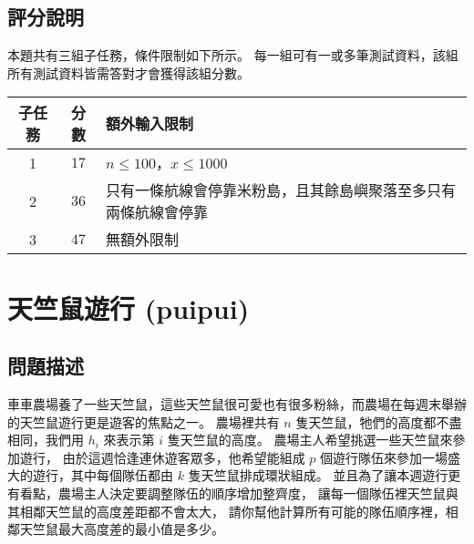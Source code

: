 \begin{example}
%
%
\end{example}

\subsection{評分說明}

本題共有三組子任務，條件限制如下所示。
每一組可有一或多筆測試資料，該組所有測試資料皆需答對才會獲得該組分數。

\begin{longtable}[]{@{}ccl@{}}
\toprule
子任務 & 分數 & 額外輸入限制 \\
\midrule
\endhead
1 & \(17\) &
\begin{math}n \le 100\end{math}，\begin{math}x \le 1000\end{math} \\
2 & \(36\) &
只有一條航線會停靠米粉島，且其餘島嶼聚落至多只有兩條航線會停靠 \\
3 & \(47\) & 無額外限制 \\
\bottomrule
\end{longtable}

\section{天竺鼠遊行 (puipui)}

\subsection{問題描述}

車車農場養了一些天竺鼠，這些天竺鼠很可愛也有很多粉絲，而農場在每週末舉辦的天竺鼠遊行更是遊客的焦點之一。
農場裡共有 \begin{math}n\end{math}
隻天竺鼠，牠們的高度都不盡相同，我們用 \begin{math}h_i\end{math}
來表示第 \begin{math}i\end{math} 隻天竺鼠的高度。
農場主人希望挑選一些天竺鼠來參加遊行，
由於這週恰逢連休遊客眾多，他希望能組成 \begin{math}p\end{math}
個遊行隊伍來參加一場盛大的遊行，其中每個隊伍都由 \begin{math}k\end{math}
隻天竺鼠排成環狀組成。
並且為了讓本週遊行更有看點，農場主人決定要調整隊伍的順序增加整齊度，
讓每一個隊伍裡天竺鼠與其相鄰天竺鼠的高度差距都不會太大，
請你幫他計算所有可能的隊伍順序裡，相鄰天竺鼠最大高度差的最小值是多少。

